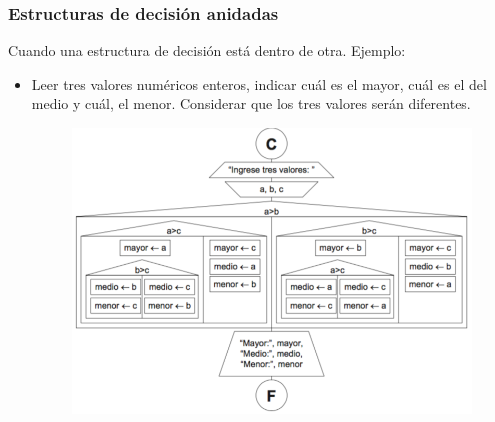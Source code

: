 \documentclass[handout]{beamer}
\begin{document}
\begin{frame}[t]\frametitle{Estructuras de decisión anidadas}
    
Cuando una estructura de decisión está dentro de otra. Ejemplo:
\begin{itemize}
  \item Leer tres valores numéricos enteros, indicar cuál es el mayor, cuál es el del medio y cuál, el menor. Considerar que los tres valores serán diferentes.
  \begin{figure}[tb]
    \centering
    \includegraphics[scale=.6]{./img/ifani}
  \end{figure}
 
\end{itemize}


\end{frame}
\end{document}
